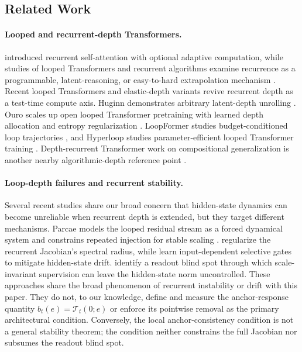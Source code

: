 \documentclass[letterpaper]{article} %
\newcommand{\Tmap}{\mathcal{T}}
\theoremstyle{remark}
\begin{document}
\subsection{Related Work}
\label{app:related-work}

\paragraph{Looped and recurrent-depth Transformers.} \citet{dehghani2019universal} introduced recurrent self-attention with optional adaptive computation, while studies of looped Transformers and recurrent algorithms examine recurrence as a programmable, latent-reasoning, or easy-to-hard extrapolation mechanism \citep{giannou2023looped,schwarzschild2021learn,bansal2022algorithm,fan2025looped,saunshi2025latent}.  Recent looped Transformers and elastic-depth variants revive recurrent depth as a test-time compute axis.  Huginn demonstrates arbitrary latent-depth unrolling \citep{geiping2025huginn}.  Ouro scales up open looped Transformer pretraining with learned depth allocation and entropy regularization \citep{zhu2025ouro}.  LoopFormer studies budget-conditioned loop trajectories \citep{jeddi2026loopformer}, and Hyperloop studies parameter-efficient looped Transformer training \citep{zeitoun2026hyperloop}.  Depth-recurrent Transformer work on compositional generalization is another nearby algorithmic-depth reference point \citep{chen2026thinking}.

\paragraph{Loop-depth failures and recurrent stability.} Several recent studies share our broad concern that hidden-state dynamics can become unreliable when recurrent depth is extended, but they target different mechanisms.  Parcae models the looped residual stream as a forced dynamical system and constrains repeated injection for stable scaling \citep{prairie2026parcae}.  \citet{yang2026stars} regularize the recurrent Jacobian's spectral radius, while \citet{park2026loopus} learn input-dependent selective gates to mitigate hidden-state drift.  \citet{sharma2026readout} identify a readout blind spot through which scale-invariant supervision can leave the hidden-state norm uncontrolled.  These approaches share the broad phenomenon of recurrent instability or drift with this paper.  They do not, to our knowledge, define and measure the anchor-response quantity $b_t(e)=\Tmap_t(0;e)$ or enforce its pointwise removal as the primary architectural condition.  Conversely, the local anchor-consistency condition is not a general stability theorem; the condition neither constrains the full Jacobian nor subsumes the readout blind spot.
\end{document}
